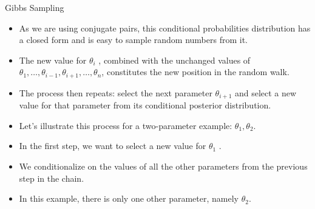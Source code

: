 \documentclass[handout]{beamer}
\begin{document}
\begin{frame}{Gibbs Sampling}
\scriptsize{

\begin{itemize}

\item As we are using conjugate pairs, this conditional probabilities distribution has a closed form and is easy to sample random numbers from it.

\item The new value for $\theta_i$ , combined with the unchanged values of $\theta_1,\dots, \theta_{i-1}, \theta_{i+1}, \dots,\theta_n$, constitutes the new position in the random walk.

\item The process then repeats: select the next parameter $\theta_{i+1}$ and select a new value for that parameter from its conditional posterior distribution.

\item Let's illustrate this process for a two-parameter example: $\theta_1,\theta_2$.

\item In the first step, we want to select a new value for $\theta_1$ . 

\item We conditionalize on the values of all the other
parameters from the previous step in the chain. 

\item In this example, there is only one other parameter, namely $\theta_2$.


\end{itemize}


} 
\end{frame}
\end{document}
